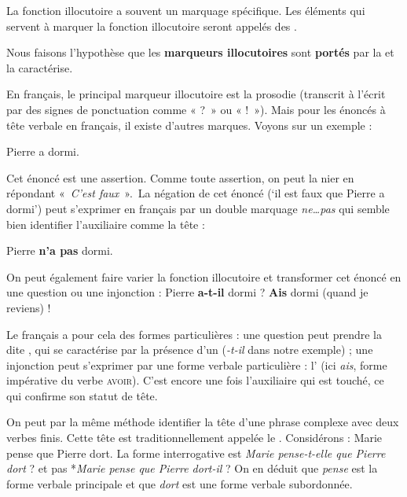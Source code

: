 La fonction illocutoire a souvent un marquage spécifique. Les éléments qui servent à marquer la fonction illocutoire seront appelés des .

\begin{styleLivreImportant}
Nous faisons l’hypothèse que les \textbf{marqueurs illocutoires} sont \textbf{portés} par la  et la caractérise.
\end{styleLivreImportant}

En français, le principal marqueur illocutoire est la prosodie (transcrit à l’écrit par des signes de ponctuation comme « ?~» ou « !~»). Mais pour les énoncés à tête verbale en français, il existe d’autres marques. Voyons sur un exemple :

\ea
{Pierre a dormi}.
\z

Cet énoncé est une assertion. Comme toute assertion, on peut la nier en répondant «~\textit{C’est faux}~».~La négation de cet énoncé (‘il est faux que Pierre a dormi’) peut s’exprimer en français par un double marquage \textit{ne…pas} qui semble bien identifier l’auxiliaire comme la tête :

\ea
{Pierre} \textbf{{n’a}  {pas}}  {dormi.}
\z

On peut également faire varier la fonction illocutoire et transformer cet énoncé en une question ou une injonction :
\ea
{Pierre} \textbf{{a-t-il}}  {dormi} ?
\z
\ea
\textbf{{Ais}}  {dormi (quand}  {je reviens)} !
\z

Le français a pour cela des formes particulières : une question peut prendre la  dite , qui se caractérise par la présence d’un  (\textit{{}-t-il} dans notre exemple) ; une injonction peut s’exprimer par une forme verbale particulière : l’ (ici \textit{ais}, forme impérative du verbe \textsc{avoir}). C’est encore une fois l’auxiliaire qui est touché, ce qui confirme son statut de tête.

On peut par la même méthode identifier la tête d’une phrase complexe avec deux verbes finis. Cette tête est traditionnellement appelée le . Considérons :
\ea
{Marie pense que Pierre dort}.
\z
La forme interrogative est \textit{Marie pense-t-elle que Pierre dort} ? et pas *\textit{Marie pense que Pierre dort-il} ? On en déduit que \textit{pense} est la forme verbale principale et que \textit{dort} est une forme verbale subordonnée.

